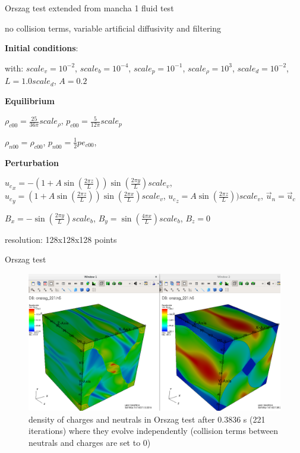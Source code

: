 \documentclass{beamer}
\begin{document}
\begin{frame}{Orszag test}
extended from mancha 1 fluid test

no collision terms, variable artificial diffusivity and filtering

\textbf{Initial conditions}:

with:
  $scale_v = 10^{-2}$,
  $scale_b = 10^{-4}$,
  $scale_p = 10^{-1}$,
  $scale_\rho = 10^{3}$,
  $scale_d = 10^{-2}$,
	$L = 1.0  scale_d$,
	$A=0.2$

{\bf Equilibrium}

$\rho_{c00} = \frac{25}{36 \pi} scale_\rho$,
$p_{c00} =  \frac{5}{12 \pi}   scale_p$

$\rho_{n00} = \rho_{c00}$,
$p_{n00} = \frac{1}{2} pe_{c00}$,


{\bf Perturbation}

${u_c}_x = -(1 + A \sin(\frac{2 \pi z}{L}))  \sin(\frac{2 \pi y}{L}) scale_v$,
${u_c}_y = (1 + A \sin(\frac{2 \pi z}{L}))  \sin(\frac{2 \pi x}{L}) scale_v$,
${u_c}_z =  A \sin(\frac{2 \pi z}{L}))  scale_v$,
$\vec{u}_n = \vec{u}_c$

$B_x = -\sin(\frac{2\pi y}{L}) scale_b$,
$B_y =  \sin(\frac{4\pi x}{L}) scale_b$,
$B_z = 0$



resolution: 128x128x128 points

\end{frame}


\begin{frame}{Orszag test}

\begin{figure}[H]
 \centering
 \includegraphics[scale=0.24]{visit2.png}
  \caption{density of charges and neutrals in Orszag test after 0.3836 s (221 iterations) where they evolve independently (collision terms between neutrals and charges are set to 0)}
\end{figure}
\end{frame}
\end{document}
